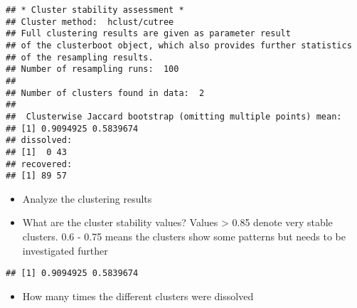 \documentclass[
]{article}
\newenvironment{Shaded}{\begin{snugshade}}{\end{snugshade}}
\newcommand{\CommentTok}[1]{\textcolor[rgb]{0.56,0.35,0.01}{\textit{#1}}}
\newcommand{\NormalTok}[1]{#1}
\newcommand{\OtherTok}[1]{\textcolor[rgb]{0.56,0.35,0.01}{#1}}
\newcommand{\SpecialCharTok}[1]{\textcolor[rgb]{0.00,0.00,0.00}{#1}}
\providecommand{\tightlist}{%
  \setlength{\itemsep}{0pt}\setlength{\parskip}{0pt}}
\begin{document}
\begin{verbatim}
## * Cluster stability assessment *
## Cluster method:  hclust/cutree 
## Full clustering results are given as parameter result
## of the clusterboot object, which also provides further statistics
## of the resampling results.
## Number of resampling runs:  100 
## 
## Number of clusters found in data:  2 
## 
##  Clusterwise Jaccard bootstrap (omitting multiple points) mean:
## [1] 0.9094925 0.5839674
## dissolved:
## [1]  0 43
## recovered:
## [1] 89 57
\end{verbatim}

\begin{itemize}
\tightlist
\item
  Analyze the clustering results
\end{itemize}

\begin{Shaded}
\end{Shaded}

\begin{itemize}
\tightlist
\item
  What are the cluster stability values? Values \textgreater{} 0.85
  denote very stable clusters. 0.6 - 0.75 means the clusters show some
  patterns but needs to be investigated further
\end{itemize}

\begin{Shaded}
\end{Shaded}

\begin{verbatim}
## [1] 0.9094925 0.5839674
\end{verbatim}

\begin{itemize}
\tightlist
\item
  How many times the different clusters were dissolved
\end{itemize}

\begin{Shaded}
\end{Shaded}
\end{document}
